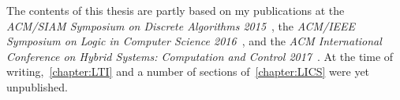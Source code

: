 \begin{originality}
  The contents of this thesis are partly based on my publications at the \emph{ACM/SIAM Symposium on Discrete Algorithms 2015}~\cite{SODA15}, the \emph{ACM/IEEE Symposium on Logic in Computer Science 2016}~\cite{LICS16}, and the \emph{ACM International Conference on Hybrid Systems: Computation and Control 2017}~\cite{HSCC17}. At the time of writing,~\cref{chapter:LTI} and a number of sections of~\cref{chapter:LICS} were yet unpublished.
\end{originality}
